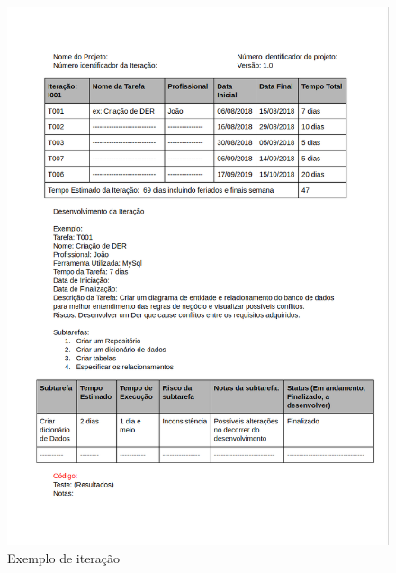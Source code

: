 \documentclass[	DIV=calc,%
							paper=a4,%
							fontsize=12pt,%
							onecolumn]{scrartcl}	 					%
\begin{document}
\begin{figure}
	\centering
	\includegraphics[width=\textwidth]{5.png}
	\caption{Exemplo de iteração}
	\label{Figura 7}
\end{figure}
\end{document}
